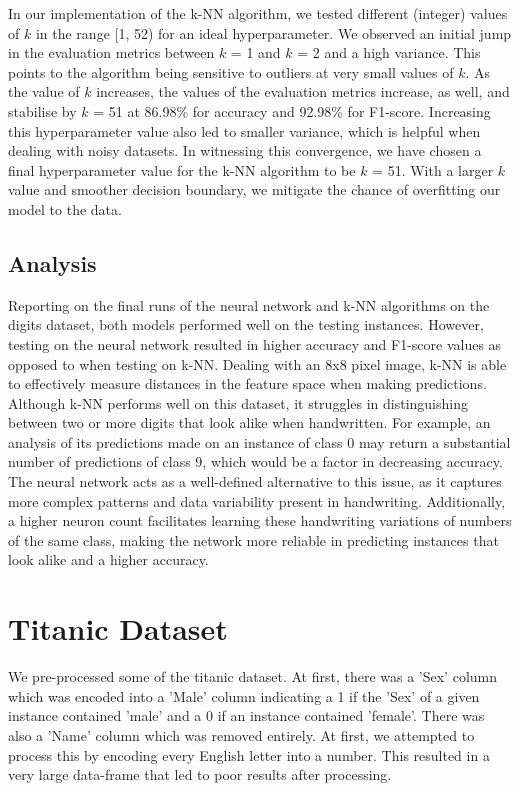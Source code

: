 \documentclass{article}
\begin{document}
In our implementation of the k-NN algorithm, we tested different (integer) values of $k$ in the range [1, 52) for an ideal hyperparameter. 
We observed an initial jump in the evaluation metrics between $k$ = 1 and $k$ = 2 and a high variance.
This points to the algorithm being sensitive to outliers at very small values of $k$.
As the value of $k$ increases, the values of the evaluation metrics increase, as well, and stabilise by $k$ = 51 at 86.98\% for accuracy and 92.98\% for F1-score.
Increasing this hyperparameter value also led to smaller variance, which is helpful when dealing with noisy datasets.
In witnessing this convergence, we have chosen a final hyperparameter value for the k-NN algorithm to be $k$ = 51.
With a larger $k$ value and smoother decision boundary, we mitigate the chance of overfitting our model to the data.


\subsection*{Analysis}
Reporting on the final runs of the neural network and k-NN algorithms on the digits dataset, both models performed well on the testing instances.
However, testing on the neural network resulted in higher accuracy and F1-score values as opposed to when testing on k-NN.
Dealing with an 8x8 pixel image, k-NN is able to effectively measure distances in the feature space when making predictions.
Although k-NN performs well on this dataset, it struggles in distinguishing between two or more digits that look alike when handwritten.
For example, an analysis of its predictions made on an instance of class 0 may return a substantial number of predictions of class 9, which would be a factor in decreasing accuracy.
\\

The neural network acts as a well-defined alternative to this issue, as it captures more complex patterns and data variability present in handwriting.
Additionally, a higher neuron count facilitates learning these handwriting variations of numbers of the same class, making the network more reliable in predicting instances that look alike and a higher accuracy.



\newpage
\section*{Titanic Dataset}
We pre-processed some of the titanic dataset. At first, there was a 'Sex' column which was encoded into a 'Male' column indicating a 1 if the 'Sex' of a given instance contained 'male' and a 0 if an instance contained 'female'.
There was also a 'Name' column which was removed entirely. At first, we attempted to process this by encoding every English letter into a number. This resulted in a very large data-frame that led to poor results after processing. 
\\
\end{document}
